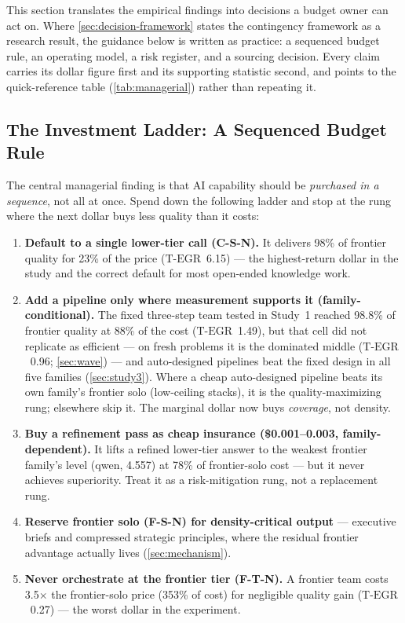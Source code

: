 \documentclass[12pt,a4paper]{article}
\newcommand{\TEGR}{\ensuremath{\text{T-EGR}}}
\begin{document}
This section translates the empirical findings into decisions a budget owner can
act on. Where \cref{sec:decision-framework} states the contingency framework as
a research result, the guidance below is written as practice: a sequenced budget
rule, an operating model, a risk register, and a sourcing decision. Every claim
carries its dollar figure first and its supporting statistic second, and points
to the quick-reference table (\cref{tab:managerial}) rather than repeating it.

\subsection{The Investment Ladder: A Sequenced Budget Rule}

The central managerial finding is that AI capability should be \emph{purchased in
a sequence}, not all at once. Spend down the following ladder and stop at the
rung where the next dollar buys less quality than it costs:

\begin{enumerate}[leftmargin=*,nosep]
  \item \textbf{Default to a single lower-tier call (C-S-N).} It delivers 98\%
        of frontier quality for 23\% of the price ($\TEGR$~6.15) --- the
        highest-return dollar in the study and the correct default for most
        open-ended knowledge work.
  \item \textbf{Add a pipeline only where measurement supports it
        (family-conditional).} The fixed three-step team tested in Study~1
        reached 98.8\% of frontier quality at 88\% of the cost
        ($\TEGR$~1.49), but that cell did not replicate as efficient --- on
        fresh problems it is the dominated middle ($\TEGR$~0.96;
        \cref{sec:wave}) --- and auto-designed pipelines beat the fixed design
        in all five families (\cref{sec:study3}). Where a cheap auto-designed
        pipeline beats its own family's frontier solo (low-ceiling stacks), it
        is the quality-maximizing rung; elsewhere skip it. The marginal dollar
        now buys \emph{coverage}, not density.
  \item \textbf{Buy a refinement pass as cheap insurance (\$0.001--0.003,
        family-dependent).} It lifts a
        refined lower-tier answer to the weakest frontier family's level (qwen,
        4.557) at 78\% of frontier-solo cost --- but it never achieves
        superiority. Treat it as a
        risk-mitigation rung, not a replacement rung.
  \item \textbf{Reserve frontier solo (F-S-N) for density-critical output} ---
        executive briefs and compressed strategic principles, where the residual
        frontier advantage actually lives (\cref{sec:mechanism}).
  \item \textbf{Never orchestrate at the frontier tier (F-T-N).} A frontier team
        costs 3.5$\times$ the frontier-solo price (353\% of cost) for negligible
        quality gain ($\TEGR$~0.27) --- the worst dollar in the experiment.
\end{enumerate}
\end{document}
